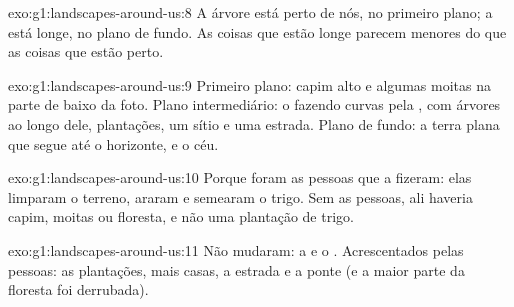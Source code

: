 \begin{solution}{exo:g1:landscapes-around-us:8}
A árvore está perto de nós, no primeiro plano; a  está longe, no
plano de fundo. As coisas que estão longe parecem menores do que as coisas
que estão perto.
\end{solution}

\begin{solution}{exo:g1:landscapes-around-us:9}
Primeiro plano: capim alto e algumas moitas na parte de baixo da foto.
Plano intermediário: o  fazendo curvas pela , com árvores ao
longo dele, plantações, um sítio e uma estrada.
Plano de fundo: a terra plana que segue até o horizonte, e o céu.
\end{solution}

\begin{solution}{exo:g1:landscapes-around-us:10}
Porque foram as pessoas que a fizeram: elas limparam o terreno, araram e
semearam o trigo. Sem as pessoas, ali haveria capim, moitas ou floresta, e
não uma plantação de trigo.
\end{solution}

\begin{solution}{exo:g1:landscapes-around-us:11}
Não mudaram: a  e o . Acrescentados pelas pessoas: as
plantações, mais casas, a estrada e a ponte (e a maior parte da floresta
foi derrubada).
\end{solution}
